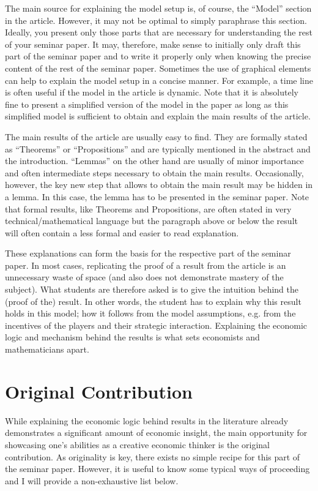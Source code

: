 \documentclass[a4paper,11pt]{article}
\begin{document}
The main source for explaining the model setup is, of course, the ``Model'' section in the article. However, it may not be optimal to simply paraphrase this section. Ideally, you present only those parts that are necessary for understanding the rest of your seminar paper. It may, therefore, make sense to initially only draft this part of the seminar paper and to write it properly only when knowing the precise content of the rest of the seminar paper. Sometimes the use of graphical elements can help to explain the model setup in a concise manner. For example, a time line is often useful if the model in the article is dynamic. Note that it is absolutely fine to present a simplified version of the model in the paper as long as this simplified model is sufficient to obtain and explain the main results of the article.

The main results of the article are usually easy to find. They are formally stated as ``Theorems'' or ``Propositions'' and are typically mentioned in the abstract and the introduction. ``Lemmas'' on the other hand are usually of minor importance and often intermediate steps necessary to obtain the main results. Occasionally, however,  the key new step that allows to obtain the main result may be hidden in a lemma. In this case, the lemma has to be presented in the seminar paper. Note that formal results, like Theorems and Propositions, are often stated in very technical/mathematical language but the paragraph above or below the result will often contain a less formal and easier to read explanation.

These explanations can form the basis for the respective part of the seminar paper. In most cases, replicating the proof of a result from the article is an unnecessary waste of space (and also does not demonstrate mastery of the subject). What students are therefore asked is to give the intuition behind the (proof of the) result. In other words, the student has to explain why this result holds in this model; how it follows from the model assumptions, e.g. from the incentives of the players and their strategic interaction. Explaining the economic logic and mechanism behind the results is what sets economists and mathematicians apart.

\section{Original Contribution}
\label{sec:orig-contr}

While explaining the economic logic behind results in the literature already demonstrates a significant amount of economic insight, the main opportunity for showcasing one's abilities as a creative economic thinker is the original contribution. As originality is key, there exists no simple recipe for this part of the seminar paper. However, it is useful to know some typical ways of proceeding and I will provide a non-exhaustive list below.
\end{document}
